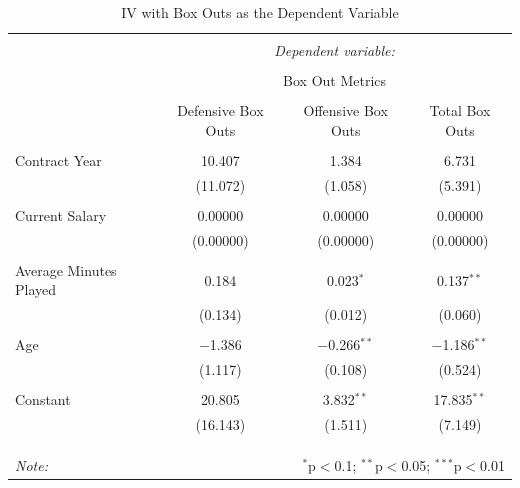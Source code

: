 \documentclass[12pt]{article}
\begin{document}
	\begin{table}[!htbp] \centering 
		\caption{IV with Box Outs as the Dependent Variable} 
		\label{} 
		\begin{tabular}{@{\extracolsep{5pt}}lccc} 
			\\[-1.8ex]\hline 
			\hline \\[-1.8ex] 
			& \multicolumn{3}{c}{\textit{Dependent variable:}} \\ 
			\cline{2-4} 
			\\[-1.8ex] & \multicolumn{3}{c}{Box Out Metrics} \\ 
			\\[-1.8ex] & Defensive Box Outs & Offensive Box Outs & Total Box Outs\\ 
			\hline \\[-1.8ex] 
			Contract Year & 10.407 & 1.384 & 6.731 \\ 
			& (11.072) & (1.058) & (5.391) \\ 
			& & & \\ 
			Current Salary & 0.00000 & 0.00000 & 0.00000 \\ 
			& (0.00000) & (0.00000) & (0.00000) \\ 
			& & & \\ 
			Average Minutes Played & 0.184 & 0.023$^{*}$ & 0.137$^{**}$ \\ 
			& (0.134) & (0.012) & (0.060) \\ 
			& & & \\ 
			Age & $-$1.386 & $-$0.266$^{**}$ & $-$1.186$^{**}$ \\ 
			& (1.117) & (0.108) & (0.524) \\ 
			& & & \\ 
			Constant & 20.805 & 3.832$^{**}$ & 17.835$^{**}$ \\ 
			& (16.143) & (1.511) & (7.149) \\ 
			& & & \\ 
			\hline \\[-1.8ex] 
			\hline 
			\hline \\[-1.8ex] 
			\textit{Note:}  & \multicolumn{3}{r}{$^{*}$p$<$0.1; $^{**}$p$<$0.05; $^{***}$p$<$0.01} \\ 
		\end{tabular} 
	\end{table} 
	
\end{document}
